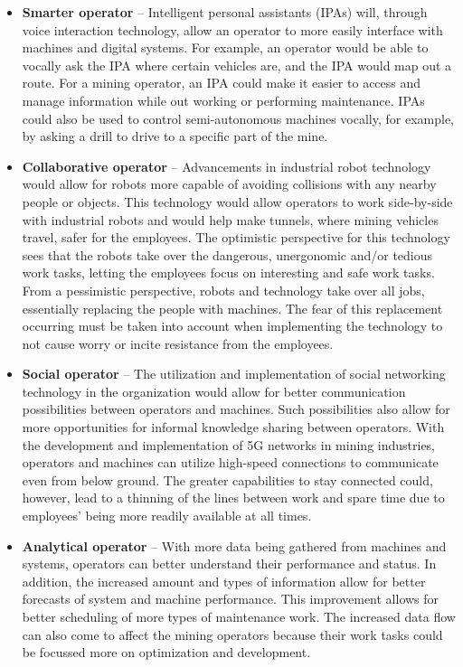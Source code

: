 \documentclass[
  12pt,
]{scrbook}
\begin{document}
\begin{itemize}
\item
  \textbf{Smarter operator} -- Intelligent personal assistants (IPAs) will, through voice interaction technology, allow an operator to more easily interface with machines and digital systems. For example, an operator would be able to vocally ask the IPA where certain vehicles are, and the IPA would map out a route. For a mining operator, an IPA could make it easier to access and manage information while out working or performing maintenance. IPAs could also be used to control semi-autonomous machines vocally, for example, by asking a drill to drive to a specific part of the mine.
\item
  \textbf{Collaborative operator} -- Advancements in industrial robot technology would allow for robots more capable of avoiding collisions with any nearby people or objects. This technology would allow operators to work side-by-side with industrial robots and would help make tunnels, where mining vehicles travel, safer for the employees. The optimistic perspective for this technology sees that the robots take over the dangerous, unergonomic and/or tedious work tasks, letting the employees focus on interesting and safe work tasks. From a pessimistic perspective, robots and technology take over all jobs, essentially replacing the people with machines. The fear of this replacement occurring must be taken into account when implementing the technology to not cause worry or incite resistance from the employees.
\item
  \textbf{Social operator} -- The utilization and implementation of social networking technology in the organization would allow for better communication possibilities between operators and machines. Such possibilities also allow for more opportunities for informal knowledge sharing between operators. With the development and implementation of 5G networks in mining industries, operators and machines can utilize high-speed connections to communicate even from below ground. The greater capabilities to stay connected could, however, lead to a thinning of the lines between work and spare time due to employees' being more readily available at all times.
\item
  \textbf{Analytical operator} -- With more data being gathered from machines and systems, operators can better understand their performance and status. In addition, the increased amount and types of information allow for better forecasts of system and machine performance. This improvement allows for better scheduling of more types of maintenance work. The increased data flow can also come to affect the mining operators because their work tasks could be focussed more on optimization and development.
\end{itemize}
\end{document}
